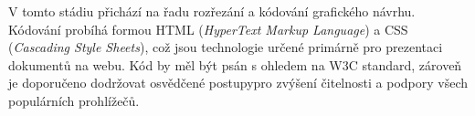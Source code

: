 V tomto stádiu přichází na řadu rozřezání a kódování grafického návrhu. Kódování probíhá formou HTML (\textit{HyperText Markup Language}) a CSS (\textit{Cascading Style Sheets}), což jsou technologie určené primárně pro prezentaci dokumentů na webu. Kód by měl být psán s ohledem na W3C standard\footnotemark[1], zároveň je doporučeno dodržovat osvědčené postupy\footnotemark[2] pro zvýšení čitelnosti a podpory všech populárních prohlížečů.


